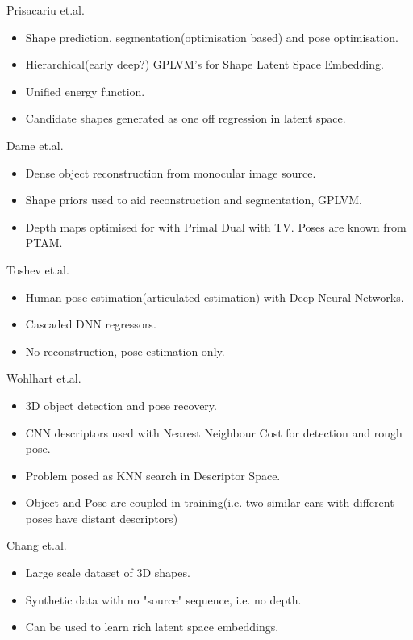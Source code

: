 Prisacariu et.al. \cite{Prisacariu2011}
\begin{itemize}
	\item Shape prediction, segmentation(optimisation based) and pose optimisation.
	\item Hierarchical(early deep?) GPLVM's for Shape Latent Space Embedding. \cite{Lawrence2005}
	\item Unified energy function.
	\item Candidate shapes generated as one off regression in latent space.
\end{itemize}

Dame et.al. \cite{Dame2013}
\begin{itemize}
	\item Dense object reconstruction from monocular image source.
	\item Shape priors used to aid reconstruction and segmentation, GPLVM.
	\item Depth maps optimised for with Primal Dual with TV. Poses are known from PTAM.
\end{itemize}

Toshev et.al. \cite{Toshev2014}
\begin{itemize}
	\item Human pose estimation(articulated estimation) with Deep Neural Networks.
	\item Cascaded DNN regressors.
	\item No reconstruction, pose estimation only.
\end{itemize}

Wohlhart et.al. \cite{Wohlhart2015}
\begin{itemize}
	\item 3D object detection and pose recovery.
	\item CNN descriptors used with Nearest Neighbour Cost for detection and rough pose.
	\item Problem posed as KNN search in Descriptor Space.
	\item Object and Pose are coupled in training(i.e. two similar cars with different poses have distant descriptors)
\end{itemize}

Chang et.al. \cite{Chang2015}
\begin{itemize}
	\item Large scale dataset of 3D shapes.
	\item Synthetic data with no "source" sequence, i.e. no depth.
	\item Can be used to learn rich latent space embeddings.
\end{itemize}

